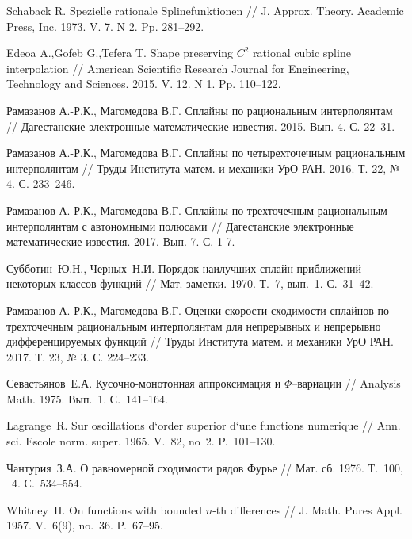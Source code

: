 \begin{thebibliography}{1}
Schaback R. Spezielle rationale Splinefunktionen // J. Approx. Theory. Academic Press, Inc. 1973. V. 7. N 2.
Pp. 281--292.

Edeoa A.,Gofeb G.,Tefera T. Shape preserving $C^2$ rational cubic spline interpolation //
 American Scientific Research Journal for Engineering, Technology and Sciences. 2015. V. 12. N 1. Pp. 110--122.


Рамазанов А.-Р.К., Магомедова В.Г. Сплайны по рациональным интерполянтам // Дагестанские электронные математические известия. 2015. Вып. 4. С. 22--31.

 Рамазанов А.-Р.К., Магомедова В.Г. Сплайны по четырехточечным рациональным интерполянтам // Труды Института матем. и механики УрО РАН. 2016. Т. 22, № 4. С. 233--246.

 Рамазанов А.-Р.К., Магомедова В.Г. Сплайны по трехточечным
рациональным интерполянтам с автономными полюсами // Дагестанские
электронные математические известия. 2017. Вып. 7. С. 1-7.

 {Субботин~Ю.Н., Черных~Н.И.} Порядок наилучших сплайн-приближений
некоторых классов функций // Мат. заметки. 1970. Т.~7, вып.~1. С.~31--42.

 Рамазанов А.-Р.К., Магомедова В.Г. Оценки скорости сходимости сплайнов
по трехточечным рациональным интерполянтам для непрерывных и непрерывно дифференцируемых функций // Труды Института матем. и механики УрО РАН. 2017. Т. 23, № 3. С. 224--233.

 {Севастьянов~Е.А.} Кусочно-монотонная аппроксимация и $\Phi$--вариации //
Analysis Math. 1975. Вып.~1. С.~141--164.

 {Lagrange~R.} Sur oscillations d`order superior d`une functions numerique
 // Ann. sci. Escole norm. super. 1965. V.~82, no~2. P.~101--130.

 {Чантурия~З.А.} О равномерной сходимости рядов Фурье // Мат. сб. 1976.
 Т.~100, \No~4. С.~534--554.

 {Whitney~H.} On functions with bounded $n$-th differences //
J. Math. Pures Appl. 1957. V.~6(9), no.~36. P.~67--95.









\end{thebibliography}
